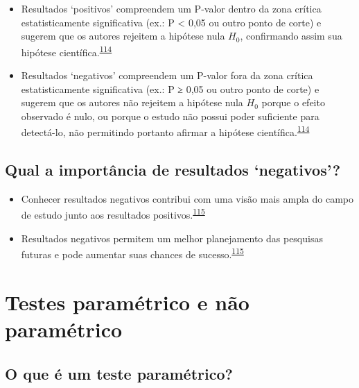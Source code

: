 \documentclass[
  a4paper,
]{book}
\begin{document}
\begin{itemize}
\item
  Resultados `positivos' compreendem um P-valor dentro da zona crítica estatisticamente significativa (ex.: P \textless{} 0,05 ou outro ponto de corte) e sugerem que os autores rejeitem a hipótese nula \(H_{0}\), confirmando assim sua hipótese científica.\textsuperscript{\protect\hyperlink{ref-greenhalgh1997a}{114}}
\item
  Resultados `negativos' compreendem um P-valor fora da zona crítica estatisticamente significativa (ex.: P ≥ 0,05 ou outro ponto de corte) e sugerem que os autores não rejeitem a hipótese nula \(H_{0}\) porque o efeito observado é nulo, ou porque o estudo não possui poder suficiente para detectá-lo, não permitindo portanto afirmar a hipótese científica.\textsuperscript{\protect\hyperlink{ref-greenhalgh1997a}{114}}
\end{itemize}

\hypertarget{qual-a-importuxe2ncia-de-resultados-negativos}{%
\subsection{Qual a importância de resultados `negativos'?}\label{qual-a-importuxe2ncia-de-resultados-negativos}}

\begin{itemize}
\item
  Conhecer resultados negativos contribui com uma visão mais ampla do campo de estudo junto aos resultados positivos.\textsuperscript{\protect\hyperlink{ref-weintraub2016}{115}}
\item
  Resultados negativos permitem um melhor planejamento das pesquisas futuras e pode aumentar suas chances de sucesso.\textsuperscript{\protect\hyperlink{ref-weintraub2016}{115}}
\end{itemize}

\hypertarget{parametric-naoparametrico}{%
\section{Testes paramétrico e não paramétrico}\label{parametric-naoparametrico}}

\hypertarget{o-que-uxe9-um-teste-paramuxe9trico}{%
\subsection{O que é um teste paramétrico?}\label{o-que-uxe9-um-teste-paramuxe9trico}}
\end{document}
